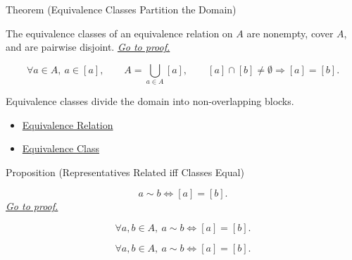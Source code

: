 \begin{theorembox}{Theorem (Equivalence Classes Partition the Domain)}
\begin{theorem}
\label{thm:equivalence-classes-partition-domain}
The equivalence classes of an equivalence relation on $A$ are nonempty, cover
$A$, and are pairwise disjoint.
\hyperref[prf:equivalence-classes-partition-domain]{\textit{Go to proof.}}
\end{theorem}
\end{theorembox}

\begin{remark*}
\[
\forall a\in A,\ a\in[a],
\qquad
A=\bigcup_{a\in A}[a],
\qquad
[a]\cap[b]\ne\emptyset \Longrightarrow [a]=[b].
\]
\end{remark*}

\begin{remark*}[Interpretation]
Equivalence classes divide the domain into non-overlapping blocks.
\end{remark*}

\begin{dependencies}
\begin{itemize}
  \item \hyperref[def:equivalence-relation]{Equivalence Relation}
  \item \hyperref[def:equivalence-class]{Equivalence Class}
\end{itemize}
\end{dependencies}

\begin{propositionbox}{Proposition (Representatives Related iff Classes Equal)}
\begin{proposition}
\label{prop:representatives-related-iff-classes-equal}
\[
a\sim b \Longleftrightarrow [a]=[b].
\]
\hyperref[prf:representatives-related-iff-classes-equal]{\textit{Go to proof.}}
\end{proposition}
\end{propositionbox}

\begin{remark*}
\[
\forall a,b\in A,\ a\sim b \Longleftrightarrow [a]=[b].
\]
\end{remark*}

\begin{remark*}
\[
\forall a,b\in A,\ a\sim b \Longleftrightarrow [a]=[b].
\]
\end{remark*}

